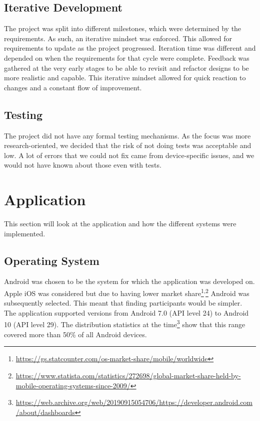 \documentclass{l4proj}
\begin{document}
\subsection{Iterative Development}
The project was split into different milestones, which were determined by the requirements. As such, an iterative mindset was enforced. This allowed for requirements to update as the project progressed. Iteration time was different and depended on when the requirements for that cycle were complete. Feedback was gathered at the very early stages to be able to revisit and refactor designs to be more realistic and capable. This iterative mindset allowed for quick reaction to changes and a constant flow of improvement.

\subsection{Testing}
The project did not have any formal testing mechanisms. As the focus was more research-oriented, we decided that the risk of not doing tests was acceptable and low. A lot of errors that we could not fix came from device-specific issues, and we would not have known about those even with tests.

\section{Application}
This section will look at the application and how the different systems were implemented.

\subsection{Operating System}
Android was chosen to be the system for which the application was developed on. Apple iOS was considered but due to having lower market share\footnote{\url{https://gs.statcounter.com/os-market-share/mobile/worldwide}}\textsuperscript{,}\footnote{\url{https://www.statista.com/statistics/272698/global-market-share-held-by-mobile-operating-systems-since-2009/}} Android was subsequently selected. This meant that finding participants would be simpler. The application supported versions from Android 7.0 (API level 24) to Android 10 (API level 29). The distribution statistics at the time\footnote{\url{https://web.archive.org/web/20190915054706/https://developer.android.com/about/dashboards}} show that this range covered more than 50\% of all Android devices.
\end{document}
